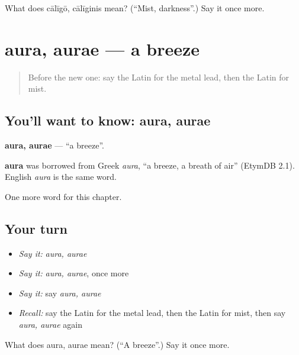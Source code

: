 \begin{tcolorbox}[breakable,colback=teal!4,colframe=teal!35!black,title={Before you move on}]
What does cālīgō, cālīginis mean? (\textquotedblleft{}Mist, darkness\textquotedblright{}.) Say it once more.
\end{tcolorbox}
\section[aura, aurae]{aura, aurae — a breeze}

\label{lesson:LA-C223-aura}



\begin{quote}
Before the new one: say the Latin for the metal lead, then the Latin for mist.
\end{quote}

\subsection*{You'll want to know: aura, aurae}
\textbf{aura, aurae} — \textquotedblleft{}a breeze\textquotedblright{}.

\begin{cousinweb}
\textbf{aura} was borrowed from Greek \emph{aura}, \textquotedblleft{}a breeze, a breath of air\textquotedblright{} (EtymDB 2.1). English \emph{aura} is the same word.
\end{cousinweb}

\begin{grammarlens}[title={What you've built}]
One more word for this chapter.
\end{grammarlens}

\subsection*{Your turn}
\begin{itemize}
\raggedright
  \item \emph{Say it:} \emph{aura, aurae}
  \item \emph{Say it:} \emph{aura, aurae}, once more
  \item \emph{Say it:} say \emph{aura, aurae}
  \item \emph{Recall:} say the Latin for the metal lead, then the Latin for mist, then say \emph{aura, aurae} again
\end{itemize}

\begin{tcolorbox}[breakable,colback=teal!4,colframe=teal!35!black,title={Before you move on}]
What does aura, aurae mean? (\textquotedblleft{}A breeze\textquotedblright{}.) Say it once more.
\end{tcolorbox}
